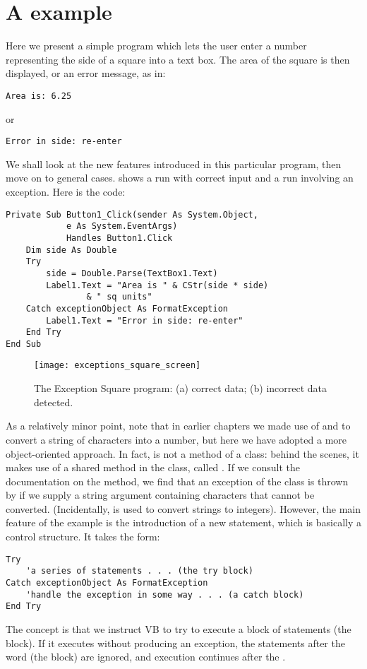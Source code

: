 	\section{A  example}
		Here we present a simple program which lets the user enter a  number representing the side of a square into a text box. The area of the square is then displayed, or an error message, as in:
		\begin{lstlisting}
Area is: 6.25
		\end{lstlisting}
or
		\begin{lstlisting}
Error in side: re-enter
		\end{lstlisting}
		We shall look at the new features introduced in this particular program, then move on to general cases.  shows a run with correct input and a run involving an exception. Here is the code:
		\begin{lstlisting}
Private Sub Button1_Click(sender As System.Object,
			e As System.EventArgs)
			Handles Button1.Click
	Dim side As Double
	Try
		side = Double.Parse(TextBox1.Text)
		Label1.Text = "Area is " & CStr(side * side)
				& " sq units"
	Catch exceptionObject As FormatException
		Label1.Text = "Error in side: re-enter"
	End Try
End Sub
		\end{lstlisting}
		\begin{figure}[tbh]
			\centering
			\texttt{[image: exceptions\_square\_screen]}
			\caption{The Exception Square program: (a) correct data; (b) incorrect data detected.}
			\label{fig:exceptions_square_screen}
		\end{figure}

		As a relatively minor point, note that in earlier chapters we made use of  and  to convert a string of characters into a number, but here we have adopted a more object-oriented approach. In fact,  is not a method of a class: behind the scenes, it makes use of a shared method in the  class, called . If we consult the documentation on the method, we find that an exception of the class  is thrown by  if we supply a string argument containing characters that cannot be converted. (Incidentally,  is used to convert strings to integers). However, the main feature of the example is the introduction of a new statement, which is basically a control structure. It takes the form:
		\begin{lstlisting}
Try
	'a series of statements . . . (the try block)
Catch exceptionObject As FormatException
	'handle the exception in some way . . . (a catch block)
End Try
		\end{lstlisting}
		The concept is that we instruct VB to try to execute a block of statements (the  block). If it executes without producing an exception, the statements after the word  (the  block) are ignored, and execution continues after the .
		
